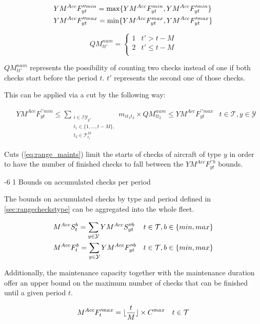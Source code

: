 \documentclass[a4paper,onecolumn,fleqn]{article}
\makeatletter
\renewcommand\section{\@startsection{section}{1}{\z@}%
                       {-6\p@ \@plus -0\p@ \@minus -0\p@}%
                       {2\p@ \@plus 0\p@ \@minus 0\p@}%
                       {\normalsize\textbf}}
\renewcommand\section{\@startsection{section}{2}{\z@}%
                       {-6\p@ \@plus -0\p@ \@minus -0\p@}%
                       {2\p@ \@plus 0\p@ \@minus 0\p@}%
                       {\normalsize\textbf}}
\renewcommand\section{\@startsection{section}{3}{\z@}%
                       {-6\p@ \@plus -0\p@ \@minus -0\p@}%
                       {1\p@ \@plus 0\p@ \@minus 0\p@}%
                       {\normalsize\itshape\bfseries}}
\makeatother
\begin{document}
  \begin{align}
    & YM^{Acc}F^{\prime\prime min}_{yt} = \max\{YM^{Acc}F^{min}_{yt}, YM^{Acc}F^{\prime min}_{yt}\}\notag\\ 
    & YM^{Acc}F^{\prime\prime max}_{yt} = \min\{YM^{Acc}F^{max}_{yt}, YM^{Acc}F^{\prime max}_{yt}\}\notag
  \end{align}

  \[
    QM^{num}_{tt'} = 
    \begin{cases} 
     1 & t' > t - M \\
     2 & t' \le t - M \\
    \end{cases} 
  \]

  $QM^{num}_{tt'}$ represents the possibility of counting two checks instead of one if both checks start before the period $t$. $t'$ represents the second one of those checks. 

  This can be applied via a cut by the following way:

  \begin{align}
    & YM^{Acc}F^{\prime\prime min}_{yt} \le \sum_{\substack{i \in \mathcal{IY}_y, \\ t_1 \in \{1, \ldots, t - M\}, \\ t_2 \in \mathcal{T}^M_{t_1}}} m_{it_1t_2} \times QM^{num}_{tt_2} \le YM^{Acc}F^{\prime\prime max}_{yt}
        & t \in \mathcal{T}, y \in \mathcal{Y} \label{eq:range_maints}
  \end{align}

  Cuts (\ref{eq:range_maints}) limit the starts of checks of aircraft of type $y$ in order to have the number of finished checks to fall between the $YM^{Acc}F^{\prime\prime b}_{yt}$ bounds.

\section{Bounds on accumulated checks per period}
  
  The bounds on accumulated checks by type and period defined in \ref{sec:rangecheckstype} can be aggregated into the whole fleet.

  \begin{align}
    & M^{Acc}S^{b}_{t} = \sum_{y \in \mathcal{Y}} YM^{Acc}S^{\prime\prime b}_{yt}
        & t \in \mathcal{T}, b \in \{min, max\}  \notag\\
    & M^{Acc}F^{b}_{t} = \sum_{y \in \mathcal{Y}} YM^{Acc}F^{\prime\prime b}_{yt}
        & t \in \mathcal{T}, b \in \{min, max\}  \notag
  \end{align}

  Additionally, the maintenance capacity together with the maintenance duration offer an upper bound on the maximum number of checks that can be finished until a given period $t$.

  \begin{align}
    & M^{Acc}F^{\prime max}_{t} = \lfloor \frac{t}{M} \rfloor \times C^{max}
        & t \in \mathcal{T} \notag
  \end{align}
\end{document}

